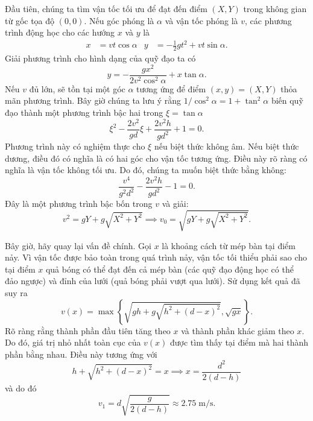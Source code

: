 \begin{solution}
Đầu tiên, chúng ta tìm vận tốc tối ưu để đạt đến điểm $(X,Y)$ trong không gian từ gốc tọa độ $(0,0).$ Nếu góc phóng là $\alpha$ và vận tốc phóng là $v$, các phương trình động học cho các hướng $x$ và $y$ là 
\begin{align*}
    x&=vt\cos\alpha & y&=-\frac 12 gt^2+vt\sin\alpha.
\end{align*}
Giải phương trình cho hình dạng của quỹ đạo ta có
\[y=-\frac{gx^2}{2v^2\cos^2\alpha}+x\tan\alpha.\]
Nếu $v$ đủ lớn, sẽ tồn tại một góc $\alpha$ tương ứng để điểm $(x,y)=(X,Y)$ thỏa mãn phương trình. Bây giờ chúng ta lưu ý rằng $1/\cos^2\alpha=1+\tan^2\alpha$ biến quỹ đạo thành một phương trình bậc hai trong $\xi=\tan\alpha$
\[\xi^2-\frac{2v^2}{gd}\xi+\frac{2v^2h}{gd^2}+1=0.\]
Phương trình này có nghiệm thực cho $\xi$ nếu biệt thức không âm. Nếu biệt thức dương, điều đó có nghĩa là có hai góc cho vận tốc tương ứng. Điều này rõ ràng có nghĩa là vận tốc không tối ưu. Do đó, chúng ta muốn biệt thức bằng không:
\[\frac{v^4}{g^2d^2}-\frac{2v^2h}{gd^2}-1=0.\]
Đây là một phương trình bậc bốn trong $v$ và giải:
\[v^2=gY+g\sqrt{X^2+Y^2}\implies v_0=\sqrt{gY+g\sqrt{X^2+Y^2}}.\]

Bây giờ, hãy quay lại vấn đề chính. Gọi $x$ là khoảng cách từ mép bàn tại điểm nảy. Vì vận tốc được bảo toàn trong quá trình nảy, vận tốc tối thiểu phải sao cho tại điểm $x$ quả bóng có thể đạt đến cả mép bàn (các quỹ đạo động học có thể đảo ngược) và đỉnh của lưới (quả bóng phải vượt qua lưới). Sử dụng kết quả đã suy ra
\[v(x)=\max\left\{\sqrt{gh+g\sqrt{h^2+(d-x)^2}},\sqrt{gx}\right\}.\]
Rõ ràng rằng thành phần đầu tiên tăng theo $x$ và thành phần khác giảm theo $x$. Do đó, giá trị nhỏ nhất toàn cục của $v(x)$ được tìm thấy tại điểm mà hai thành phần bằng nhau. Điều này tương ứng với
\[h+\sqrt{h^2+(d-x)^2}=x\implies x=\frac{d^2}{2(d-h)}\]
và do đó
\[v_1=d\sqrt{\frac{g}{2(d-h)}}\approx2.75\;\mathrm{m/s}.\]
\end{solution}
